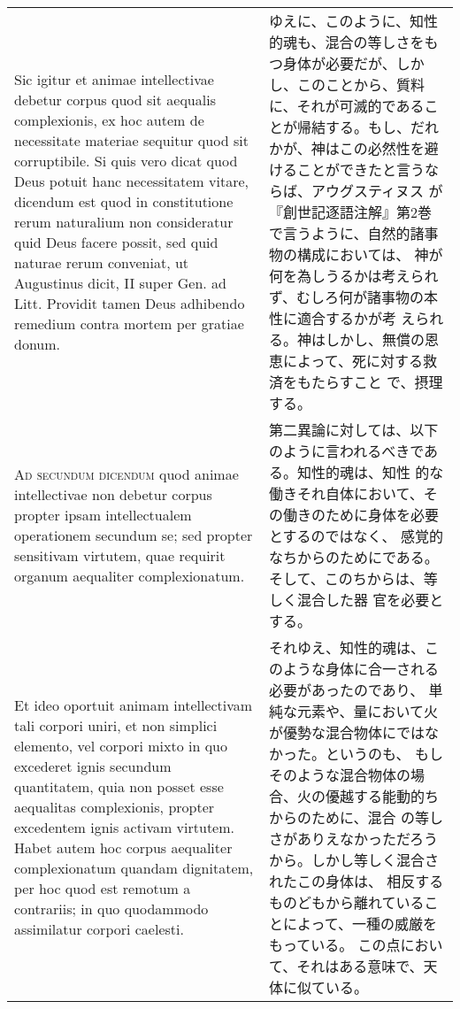 \documentclass[paper=a4paper,fontsize=10pt,jafontsize=9pt,titlepage]{jlreq}
\begin{document}
\begin{longtable}{p{21em}p{21em}}
\\


 Sic igitur et animae intellectivae debetur corpus quod sit aequalis
 complexionis, ex hoc autem de necessitate materiae sequitur quod sit
 corruptibile. Si quis vero dicat quod Deus potuit hanc necessitatem
 vitare, dicendum est quod in constitutione rerum naturalium non
 consideratur quid Deus facere possit, sed quid naturae rerum
 conveniat, ut Augustinus dicit, II super Gen. ad Litt. Providit tamen
 Deus adhibendo remedium contra mortem per gratiae donum.

&

ゆえに、このように、知性的魂も、混合の等しさをもつ身体が必要だが、しか
し、このことから、質料に、それが可滅的であることが帰結する。もし、だれ
かが、神はこの必然性を避けることができたと言うならば、アウグスティヌス
が『創世記逐語注解』第2巻で言うように、自然的諸事物の構成においては、
神が何を為しうるかは考えられず、むしろ何が諸事物の本性に適合するかが考
えられる。神はしかし、無償の恩恵によって、死に対する救済をもたらすこと
で、摂理する。
 
\\



 {\scshape Ad secundum dicendum} quod animae intellectivae non debetur
 corpus propter ipsam intellectualem operationem secundum se; sed
 propter sensitivam virtutem, quae requirit organum aequaliter
 complexionatum.

 &

 第二異論に対しては、以下のように言われるべきである。知性的魂は、知性
 的な働きそれ自体において、その働きのために身体を必要とするのではなく、
 感覚的なちからのためにである。そして、このちからは、等しく混合した器
 官を必要とする。

\\

 
 Et ideo oportuit animam intellectivam tali corpori uniri, et non
 simplici elemento, vel corpori mixto in quo excederet ignis secundum
 quantitatem, quia non posset esse aequalitas complexionis, propter
 excedentem ignis activam virtutem. Habet autem hoc corpus aequaliter
 complexionatum quandam dignitatem, per hoc quod est remotum a
 contrariis; in quo quodammodo assimilatur corpori caelesti.
 
 &

 それゆえ、知性的魂は、このような身体に合一される必要があったのであり、
 単純な元素や、量において火が優勢な混合物体にではなかった。というのも、
 もしそのような混合物体の場合、火の優越する能動的ちからのために、混合
 の等しさがありえなかっただろうから。しかし等しく混合されたこの身体は、
 相反するものどもから離れていることによって、一種の威厳をもっている。
 この点において、それはある意味で、天体に似ている。


\end{longtable}
\end{document}
